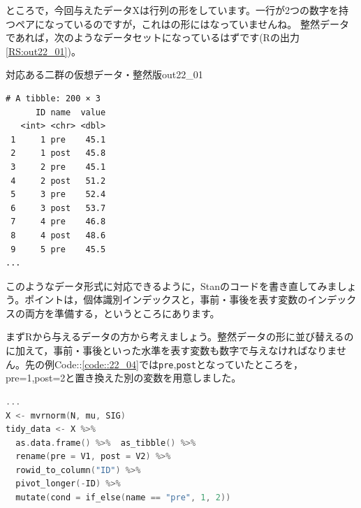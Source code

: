 \documentclass{ltjsbook}
\begin{document}
ところで，今回与えたデータXは行列の形をしています。一行が2つの数字を持つペアになっているのですが，これはの形にはなっていませんね。
整然データであれば，次のようなデータセットになっているはずです(Rの出力\ref{RS:out22_01})。
\begin{Rscreen}{対応ある二群の仮想データ・整然版}{out22_01}
\begin{verbatim}
# A tibble: 200 × 3
      ID name  value
   <int> <chr> <dbl>
 1     1 pre    45.1
 2     1 post   45.8
 3     2 pre    45.1
 4     2 post   51.2
 5     3 pre    52.4
 6     3 post   53.7
 7     4 pre    46.8
 8     4 post   48.6
 9     5 pre    45.5
...

\end{verbatim}
\end{Rscreen}
このようなデータ形式に対応できるように，Stanのコードを書き直してみましょう。ポイントは，個体識別インデックスと，事前・事後を表す変数のインデックスの両方を準備する，というところにあります。

まずRから与えるデータの方から考えましょう。整然データの形に並び替えるのに加えて，事前・事後といった水準を表す変数も数字で与えなければなりません。先の例Code::\ref{code::22_04}では\verb|pre|,\verb|post|となっていたところを，pre=1,post=2と置き換えた別の変数を用意しました。
\begin{lstlisting}[language=c++,label={code::22_04},caption={対応ある二群の仮想データ・整然版}]
...
X <- mvrnorm(N, mu, SIG)
tidy_data <- X %>%
  as.data.frame() %>%  as_tibble() %>%
  rename(pre = V1, post = V2) %>%
  rowid_to_column("ID") %>%
  pivot_longer(-ID) %>%
  mutate(cond = if_else(name == "pre", 1, 2))
\end{lstlisting}
\end{document}
